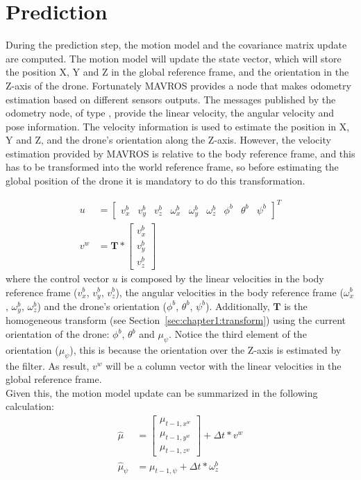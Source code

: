 \section{Prediction}
\label{sec:chapter2:prediction}
During the prediction step, the motion model and the covariance matrix update are computed. The motion model will update the state vector, which will store the position X, Y and Z in the global reference frame, and the orientation in the Z-axis of the drone. Fortunately MAVROS provides a node that makes odometry estimation based on different sensors outputs. The messages published by the odometry node, of type , provide the linear velocity, the angular velocity and pose information. The velocity information is used to estimate the position in X, Y and Z, and the drone's orientation along the Z-axis. However, the velocity estimation provided by MAVROS is relative to the body reference frame, and this has to be transformed into the world reference frame, so before estimating the global position of the drone it is mandatory to do this transformation.

\begin{align}
    u &= \begin{bmatrix} v_x^b & v_y^b & v_z^b & \omega_x^b & \omega_y^b & \omega_z^b & \phi^b & \theta^b & \psi^b \end{bmatrix}^T\\
    v^w &= \textbf{T} * \begin{bmatrix} v_x^b \\ v_y^b \\ v_z^b \end{bmatrix}
\end{align}
where the control vector $u$ is composed by the linear velocities in the body reference frame ($v_x^b$, $v_y^b$, $v_z^b$), the angular velocities in the body reference frame ($\omega_x^b$, $\omega_y^b$, $\omega_z^b$) and the drone's orientation ($\phi^b$, $\theta^b$, $\psi^b$). Additionally, $\textbf{T}$ is the homogeneous transform (see Section~\ref{sec:chapter1:transform}) using the current orientation of the drone: $\phi^b$, $\theta^b$ and $\mu_{\psi}$. Notice the third element of the orientation ($\mu_{\psi}$), this is because the orientation over the Z-axis is estimated by the filter. As result, $v^w$ will be a column vector with the linear velocities in the global reference frame. \\

Given this, the motion model update can be summarized in the following calculation:
\begin{align}
    \hat\mu &=
    \begin{bmatrix}
        \mu_{t-1, x^w} \\ \mu_{t-1, y^w} \\ \mu_{t-1, z^w}
    \end{bmatrix}
    + \Delta t * v^w \\
    \hat\mu_{\psi} &= \mu_{t-1, \psi} + \Delta t * \omega_z^b
\end{align}

